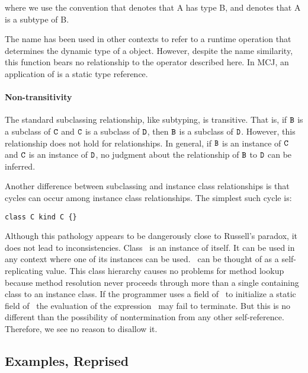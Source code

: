 \documentclass[nocopyrightspace,10pt]{acm-sigplan}
\begin{document}
\hspace{-.43cm}where we use the convention that {} denotes
that {\txt A} has type {\txt B}, and {} denotes that {\txt A}
is a subtype of {\txt B}.

The name {} has been used in other contexts to refer to a
runtime operation that determines the dynamic type of a object.
However, despite the name similarity, this function bears no
relationship to the operator described here.  In MCJ, an application
of {} is a static type reference.

\paragraph{Non-transitivity}

The standard subclassing relationship, like subtyping, is transitive.
That is, if $\mbox {\tt B}$ is a subclass of $\mathtt{{C}}$ and $\mathtt{{C}}$ is a subclass of $\mathtt{{D}}$,
then $\mbox {\tt B}$ is a subclass of $\mathtt{{D}}$.  However, this relationship does not
hold for {} relationships.  In general, if $\mbox {\tt B}$ is an
instance of $\mathtt{{C}}$ and $\mathtt{{C}}$ is an instance of $\mathtt{{D}}$, no judgment
about the relationship of $\mbox {\tt B}$ to $\mathtt{{D}}$ can be inferred.

Another difference between subclassing and instance class
relationships is that cycles can occur among instance class
relationships. The simplest such cycle is:

\begin{verbatim}
class C kind C {}
\end{verbatim}

Although this pathology appears to be dangerously close to Russell's
paradox, it does not lead to inconsistencies.  Class \C\ is an
instance of itself. It can be used in any context where one of its
instances can be used.  \C\ can be thought of as a self-replicating
value. This class hierarchy causes no problems for method lookup
because method resolution never proceeds through more than a single
containing class to an instance class. If the programmer uses a field
of \C\ to initialize a static field of \C\, the evaluation of the
expression \C\ may fail to terminate.  But this is no different than
the possibility of nontermination from any other self-reference.
Therefore, we see no reason to disallow it.


\subsection{Examples, Reprised}
\end{document}
